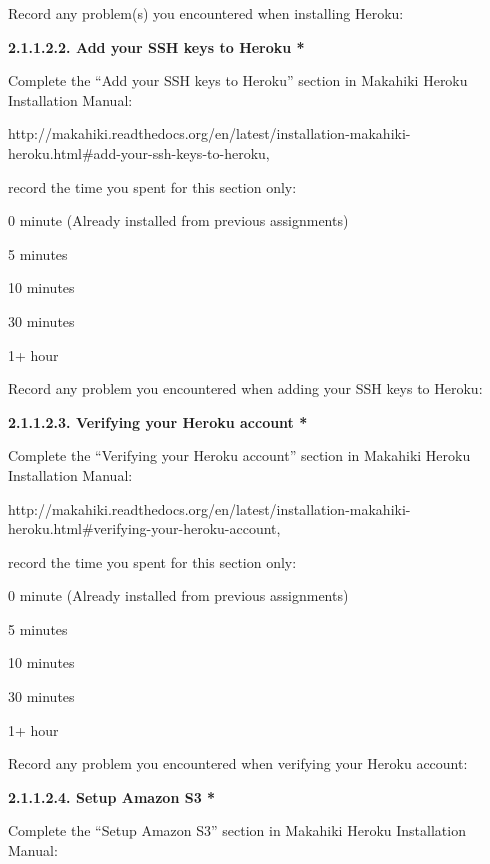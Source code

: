 Record any problem(s) you encountered when installing Heroku: \underline{\hspace{4cm}}

{\bf 2.1.1.2.2. Add your SSH keys to Heroku *}

Complete the ``Add your SSH keys to Heroku'' section in Makahiki Heroku Installation Manual:

http://makahiki.readthedocs.org/en/latest/installation-makahiki-heroku.html\#add-your-ssh-keys-to-heroku, 

record the time you spent for this section only:

\begin{radiobutton}
\item 0 minute (Already installed from previous assignments)
\item 5 minutes
\item  10 minutes
\item  30 minutes
\item  1+ hour
\end{radiobutton}

Record any problem you encountered when adding your SSH keys to Heroku: \underline{\hspace{3cm}}

{\bf 2.1.1.2.3. Verifying your Heroku account *}

Complete the ``Verifying your Heroku account'' section in Makahiki Heroku Installation Manual:

http://makahiki.readthedocs.org/en/latest/installation-makahiki-heroku.html\#verifying-your-heroku-account, 

record the time you spent for this section only:

\begin{radiobutton}
\item 0 minute (Already installed from previous assignments)
\item 5 minutes
\item  10 minutes
\item  30 minutes
\item  1+ hour
\end{radiobutton}

Record any problem you encountered when verifying your Heroku account: \underline{\hspace{3cm}}

{\bf 2.1.1.2.4. Setup Amazon S3 *}

Complete the ``Setup Amazon S3'' section in Makahiki Heroku Installation Manual:

